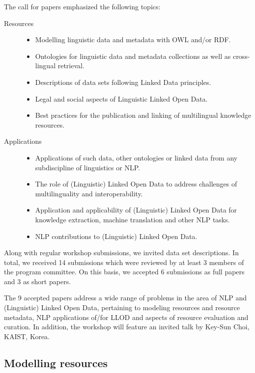 The call for papers emphasized the following topics:

\begin{description}
\item[Resources]
	\begin{itemize}
	\item Modelling linguistic data and metadata with OWL and/or RDF.
    \item Ontologies for linguistic data and metadata collections as well as cross-lingual retrieval.
    \item Descriptions of data sets following Linked Data principles.
    \item Legal and social aspects of Linguistic Linked Open Data.
    \item Best practices for the publication and linking of multilingual knowledge resources.
	\end{itemize}
\item[Applications]
	\begin{itemize}
	\item Applications of such data, other ontologies or linked data from any subdiscipline of linguistics or NLP.
    \item The role of (Linguistic) Linked Open Data to address challenges of multilinguality and interoperability.
    \item Application and applicability of (Linguistic) Linked Open Data for knowledge extraction, machine translation and other NLP tasks.
    \item NLP contributions to (Linguistic) Linked Open Data.
	\end{itemize}
\end{description}

\noindent 
Along with regular workshop submissions, we invited data set descriptions.
In total, we received 14 submissions which were reviewed by at least 3 members of the program committee. 
On this basis, we accepted 6 submissions as full papers and 3 as short papers.

The 9 accepted papers address a wide range of problems in the area of NLP and (Linguistic) Linked Open Data, pertaining to modeling resources and resource metadata, NLP applications of/for LLOD and aspects of resource evaluation and curation. In addition, the workshop will feature an invited talk by Key-Sun Choi, KAIST, Korea.

\subsection{Modelling resources}

